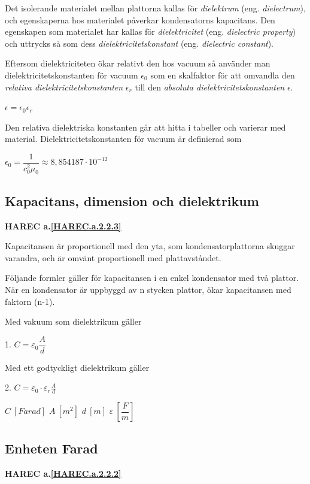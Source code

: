 Det isolerande materialet mellan plattorna kallas för \emph{dielektrum}
(eng. \emph{dielectrum}), och egenskaperna hos materialet påverkar
kondensatorns kapacitans.
Den egenskapen som materialet har kallas för \emph{dielektricitet}
(eng. \emph{dielectric property}) och uttrycks så som dess
\emph{dielektricitetskonstant} (eng. \emph{dielectric constant}).

Eftersom dielektriciteten ökar relativt den hos vacuum så använder man
dielektricitetskonstanten för vacuum \(\epsilon_0\) som en skalfaktor för att
omvandla den \emph{relativa dielektricitetskonstanten} \(\epsilon_r\) till den
\emph{absoluta dielektricitetskonstanten} \(\epsilon\).

\(\epsilon = \epsilon_0\epsilon_r\)

Den relativa dielektriska konstanten går att hitta i tabeller och varierar
med material. Dielektricitetskonstanten för vacuum är definierad som

\(\epsilon_0 = \dfrac{1}{c_0^2\mu_0} \approx 8,854187 \cdot 10^{-12}\)

\subsection{Kapacitans, dimension och dielektrikum}
\textbf{HAREC a.\ref{HAREC.a.2.2.3}\label{myHAREC.a.2.2.3}}

Kapacitansen är proportionell med den yta, som kondensatorplattorna skuggar
varandra, och är omvänt proportionell med plattavståndet.

Följande formler gäller för kapacitansen i en enkel kondensator med två
plattor. När en kondensator är uppbyggd av n stycken plattor, ökar kapacitansen
med faktorn (n-1).

Med vakuum som dielektrikum gäller

1. \(C = \varepsilon _0 \dfrac{A}{d}\)

Med ett godtyckligt dielektrikum gäller

2. \(C = \varepsilon _0 \cdot \varepsilon _r \frac{A}{d}\)

\(C\ [Farad]\) \(A\ [m^2]\) \(d\ [m]\) \(\varepsilon\ [\dfrac{F}{m}]\)

\subsection{Enheten Farad}
\textbf{HAREC a.\ref{HAREC.a.2.2.2}\label{myHAREC.a.2.2.2}}

